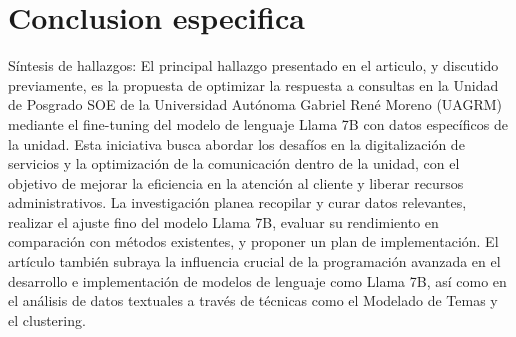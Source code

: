 \documentclass[12pt,twocolumn]{article}
\begin{document}
\section{Conclusion especifica}
Síntesis de hallazgos:
El principal hallazgo presentado en el articulo, y discutido previamente, es la propuesta de optimizar la respuesta a consultas en la Unidad de Posgrado SOE de la Universidad Autónoma Gabriel René Moreno (UAGRM) mediante el fine-tuning del modelo de lenguaje Llama 7B con datos específicos de la unidad. 
Esta iniciativa busca abordar los desafíos en la digitalización de servicios y la optimización de la comunicación dentro de la unidad, con el objetivo de mejorar la eficiencia en la atención al cliente y liberar recursos administrativos.
La investigación planea recopilar y curar datos relevantes, realizar el ajuste fino del modelo Llama 7B, evaluar su rendimiento en comparación con métodos existentes, y proponer un plan de implementación. 
El artículo también subraya la influencia crucial de la programación avanzada en el desarrollo e implementación de modelos de lenguaje como Llama 7B, así como en el análisis de datos textuales a través de técnicas como el Modelado de Temas y el clustering.
\end{document}
